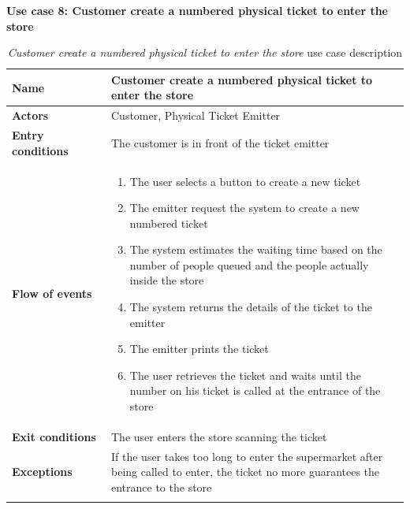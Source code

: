 \clearpage
\textbf{Use case 8: Customer create a numbered physical ticket to enter the store}
\smallskip
{}
\begin{longtable}{p{0.25\linewidth}p{0.75\linewidth}}
    \toprule
    \textbf{Name}             & \textbf{Customer create a numbered physical ticket to enter the store}                                                                   \\
    \midrule
    \textbf{Actors}           & Customer, Physical Ticket Emitter                                                                                                        \\
    \midrule
    \textbf{Entry conditions} & The customer is in front of the ticket emitter                                                                                           \\
    \midrule
    \textbf{Flow of events}   &
    \begin{enumerate}
        \item The user selects a button to create a new ticket
        \item The emitter request the system to create a new numbered ticket
        \item The system estimates the waiting time based on the number of people queued and the people actually inside the store
        \item The system returns the details of the ticket to the emitter
        \item The emitter prints the ticket
        \item The user retrieves the ticket and waits until the number on his ticket is called at the entrance of the store
    \end{enumerate}                                                                                                                                           \\
    \midrule
    \textbf{Exit conditions}  & The user enters the store scanning the ticket                                                                                            \\
    \midrule
    \textbf{Exceptions}       & If the user takes too long to enter the supermarket after being called to enter, the ticket no more guarantees the entrance to the store \\
    \bottomrule
    \caption{\emph{Customer create a numbered physical ticket to enter the store} use case description}
\end{longtable}


